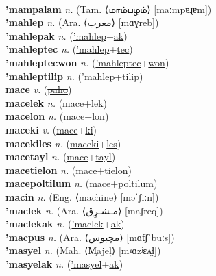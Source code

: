  \label{mamulak} \\
\textbf{'mampalam} \textit{n.} (Tam. ⟨மாம்பழம்⟩ [maːmpɐɻɐm])
 \label{'mampalam} \\
\textbf{'mahlep} \textit{n.} (Ara. ⟨مغرب‎⟩ [mɑɣreb])
 \label{'mahlep} \\
\textbf{'mahlepak} \textit{n.} (\hyperref['mahlep]{'mahlep}+\hyperref[ak]{ak})
 \label{'mahlepak} \\
\textbf{'mahleptec} \textit{n.} (\hyperref['mahlep]{'mahlep}+\hyperref[tec]{tec})
 \label{'mahleptec} \\
\textbf{'mahleptecwon} \textit{n.} (\hyperref['mahleptec]{'mahleptec}+\hyperref[won]{won})
 \label{'mahleptecwon} \\
\textbf{'mahleptilip} \textit{n.} (\hyperref['mahlep]{'mahlep}+\hyperref[tilip]{tilip})
 \label{'mahleptilip} \\
\textbf{mace} \textit{v.} (\hyperref[paho]{\sout{paho}})
 \label{mace} \\
\textbf{macelek} \textit{n.} (\hyperref[mace]{mace}+\hyperref[lek]{lek})
 \label{macelek} \\
\textbf{macelon} \textit{n.} (\hyperref[mace]{mace}+\hyperref[lon]{lon})
 \label{macelon} \\
\textbf{maceki} \textit{v.} (\hyperref[mace]{mace}+\hyperref[ki]{ki})
 \label{maceki} \\
\textbf{macekiles} \textit{n.} (\hyperref[maceki]{maceki}+\hyperref[les]{les})
 \label{macekiles} \\
\textbf{macetayl} \textit{n.} (\hyperref[mace]{mace}+\hyperref[tayl]{tayl})
 \label{macetayl} \\
\textbf{macetielon} \textit{n.} (\hyperref[mace]{mace}+\hyperref[tielon]{tielon})
 \label{macetielon} \\
\textbf{macepoltilum} \textit{n.} (\hyperref[mace]{mace}+\hyperref[poltilum]{poltilum})
 \label{macepoltilum} \\
\textbf{macin} \textit{n.} (Eng. ⟨machine⟩ [məˈʃiːn])
 \label{macin} \\
\textbf{'maclek} \textit{n.} (Ara. ⟨مـشـرِق‎‎⟩ [maʃreq])
 \label{'maclek} \\
\textbf{'maclekak} \textit{n.} (\hyperref['maclek]{'maclek}+\hyperref[ak]{ak})
 \label{'maclekak} \\
\textbf{'macpus} \textit{n.} (Ara. ⟨مچبوس⟩ [mɑt͡ʃˈbuːs])
 \label{'macpus} \\
\textbf{'masyel} \textit{n.} (Mah. ⟨M̧ajeļ⟩ [mˠɑzʲɛʌ̯ɫ])
 \label{'masyel} \\
\textbf{'masyelak} \textit{n.} (\hyperref['masyel]{'masyel}+\hyperref[ak]{ak})
